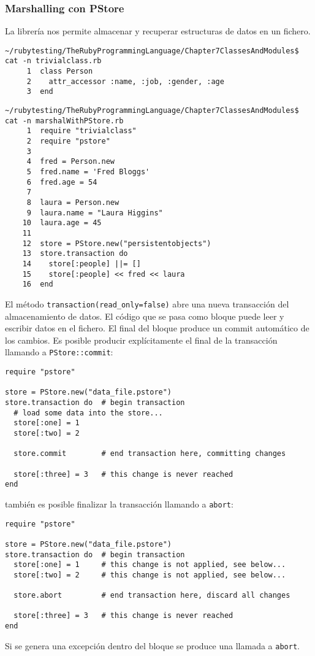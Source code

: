 \subsubsection{Marshalling con PStore}

La librería  nos permite almacenar y recuperar estructuras de datos en un fichero.
\begin{verbatim}
~/rubytesting/TheRubyProgrammingLanguage/Chapter7ClassesAndModules$ cat -n trivialclass.rb 
     1  class Person
     2    attr_accessor :name, :job, :gender, :age
     3  end
\end{verbatim}

\begin{verbatim}
~/rubytesting/TheRubyProgrammingLanguage/Chapter7ClassesAndModules$ cat -n marshalWithPStore.rb
     1  require "trivialclass"
     2  require "pstore"
     3  
     4  fred = Person.new
     5  fred.name = 'Fred Bloggs'
     6  fred.age = 54
     7  
     8  laura = Person.new
     9  laura.name = "Laura Higgins"
    10  laura.age = 45
    11  
    12  store = PStore.new("persistentobjects")
    13  store.transaction do
    14    store[:people] ||= []
    15    store[:people] << fred << laura
    16  end
\end{verbatim}
El método \verb|transaction(read_only=false)|
abre una nueva transacción del almacenamiento de datos.
El código que se pasa como bloque puede leer y escribir datos en el fichero.
El final del bloque produce un commit automático de los cambios.
Es posible producir explícitamente el final de la transacción
llamando a \verb|PStore::commit|:
\begin{verbatim}
require "pstore"

store = PStore.new("data_file.pstore")
store.transaction do  # begin transaction
  # load some data into the store...
  store[:one] = 1
  store[:two] = 2

  store.commit        # end transaction here, committing changes

  store[:three] = 3   # this change is never reached
end
\end{verbatim}
también es posible finalizar la transacción llamando a \verb|abort|:
\begin{verbatim}
require "pstore"

store = PStore.new("data_file.pstore")
store.transaction do  # begin transaction
  store[:one] = 1     # this change is not applied, see below...
  store[:two] = 2     # this change is not applied, see below...

  store.abort         # end transaction here, discard all changes

  store[:three] = 3   # this change is never reached
end
\end{verbatim}
Si se genera una excepción dentro del bloque se produce una llamada a \verb|abort|.


